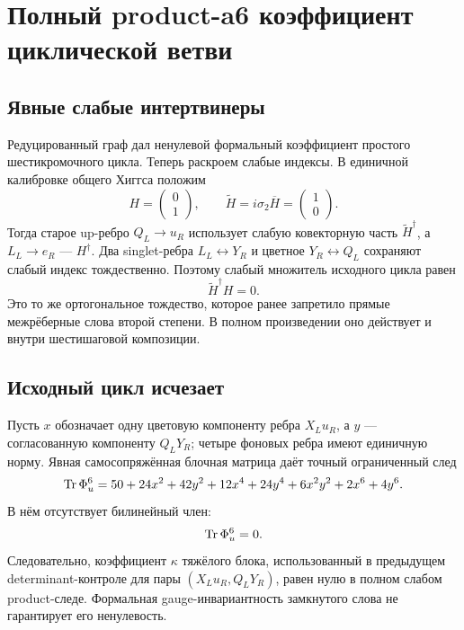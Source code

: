 \chapter{Полный product-a6 коэффициент циклической ветви}
\label{ch:v7-full-product-a6-cycle-coefficient-gate}

\section{Явные слабые интертвинеры}

Редуцированный граф дал ненулевой формальный коэффициент простого
шестикромочного цикла. Теперь раскроем слабые индексы. В единичной
калибровке общего Хиггса положим
\begin{equation}
 H=\begin{pmatrix}0\\1\end{pmatrix},\qquad
 \widetilde H=i\sigma_2\overline H
 =\begin{pmatrix}1\\0\end{pmatrix}.
 \label{eq:v7-full-a6-higgs-frame}
\end{equation}
Тогда старое up-ребро $Q_L\to u_R$ использует слабую ковекторную часть
$\widetilde H^\dagger$, а $L_L\to e_R$ --- $H^\dagger$. Два singlet-ребра
$L_L\leftrightarrow Y_R$ и цветное $Y_R\leftrightarrow Q_L$ сохраняют
слабый индекс тождественно. Поэтому слабый множитель исходного цикла равен
\begin{equation}
 \boxed{\widetilde H^\dagger H=0.}
 \label{eq:v7-full-a6-up-overlap-zero}
\end{equation}
Это то же ортогональное тождество, которое ранее запретило прямые
межрёберные слова второй степени. В полном произведении оно действует и
внутри шестишаговой композиции.

\section{Исходный цикл исчезает}

Пусть $x$ обозначает одну цветовую компоненту ребра $X_Lu_R$, а $y$ ---
согласованную компоненту $Q_LY_R$; четыре фоновых ребра имеют единичную
норму. Явная самосопряжённая блочная матрица даёт точный ограниченный след
\begin{equation}
 \operatorname{Tr}\Phi_u^6
 =50+24x^2+42y^2+12x^4+24y^4
 +6x^2y^2+2x^6+4y^6.
 \label{eq:v7-full-a6-up-polynomial}
\end{equation}
В нём отсутствует билинейный член:
\begin{equation}
 [xy]\Tr\Phi_u^6=0.
 \label{eq:v7-full-a6-up-mixed-zero}
\end{equation}
Следовательно, коэффициент $\kappa$ тяжёлого блока, использованный в
предыдущем determinant-контроле для пары $(X_Lu_R,Q_LY_R)$, равен нулю в
полном слабом product-следе. Формальная gauge-инвариантность замкнутого
слова не гарантирует его ненулевость.

